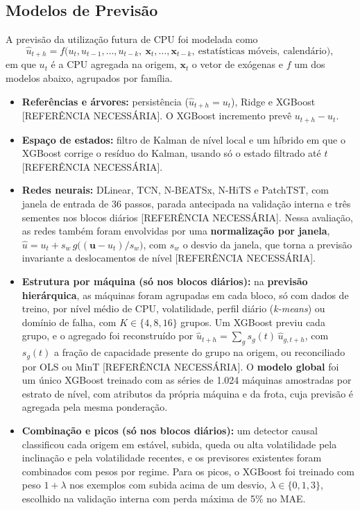 \documentclass[a4paper,12pt]{article}
\newcommand{\refnec}{[REFERÊNCIA NECESSÁRIA]}
\begin{document}
\subsection{Modelos de Previsão}
\label{sec:modelos}

A previsão da utilização futura de CPU foi modelada como
\begin{equation}
\hat{u}_{t+h} = f\big(u_t, u_{t-1}, \ldots, u_{t-k},\ \mathbf{x}_t, \ldots, \mathbf{x}_{t-k},\ \text{estatísticas móveis},\ \text{calendário}\big),
\end{equation}
em que $u_t$ é a CPU agregada na origem, $\mathbf{x}_t$ o vetor de exógenas e $f$ um dos modelos abaixo, agrupados por família.

\begin{itemize}
    \item \textbf{Referências e árvores:} persistência ($\hat{u}_{t+h} = u_t$), Ridge e XGBoost \refnec. O XGBoost incremento prevê $u_{t+h} - u_t$.
    \item \textbf{Espaço de estados:} filtro de Kalman de nível local e um híbrido em que o XGBoost corrige o resíduo do Kalman, usando só o estado filtrado até $t$ \refnec.
    \item \textbf{Redes neurais:} DLinear, TCN, N-BEATSx, N-HiTS e PatchTST, com janela de entrada de 36 passos, parada antecipada na validação interna e três sementes nos blocos diários \refnec. Nessa avaliação, as redes também foram envolvidas por uma \textbf{normalização por janela}, $\hat{u} = u_t + s_w\, g\big((\mathbf{u} - u_t)/s_w\big)$, com $s_w$ o desvio da janela, que torna a previsão invariante a deslocamentos de nível \refnec.
    \item \textbf{Estrutura por máquina (só nos blocos diários):} na \textbf{previsão hierárquica}, as máquinas foram agrupadas em cada bloco, só com dados de treino, por nível médio de CPU, volatilidade, perfil diário (\textit{k-means}) ou domínio de falha, com $K \in \{4, 8, 16\}$ grupos. Um XGBoost previu cada grupo, e o agregado foi reconstruído por $\hat{u}_{t+h} = \sum_g s_g(t)\,\hat{u}_{g,t+h}$, com $s_g(t)$ a fração de capacidade presente do grupo na origem, ou reconciliado por OLS ou MinT \refnec. O \textbf{modelo global} foi um único XGBoost treinado com as séries de 1.024 máquinas amostradas por estrato de nível, com atributos da própria máquina e da frota, cuja previsão é agregada pela mesma ponderação.
    \item \textbf{Combinação e picos (só nos blocos diários):} um detector causal classificou cada origem em estável, subida, queda ou alta volatilidade pela inclinação e pela volatilidade recentes, e os previsores existentes foram combinados com pesos por regime. Para os picos, o XGBoost foi treinado com peso $1 + \lambda$ nos exemplos com subida acima de um desvio, $\lambda \in \{0, 1, 3\}$, escolhido na validação interna com perda máxima de 5\% no MAE.

\end{itemize}
\end{document}
